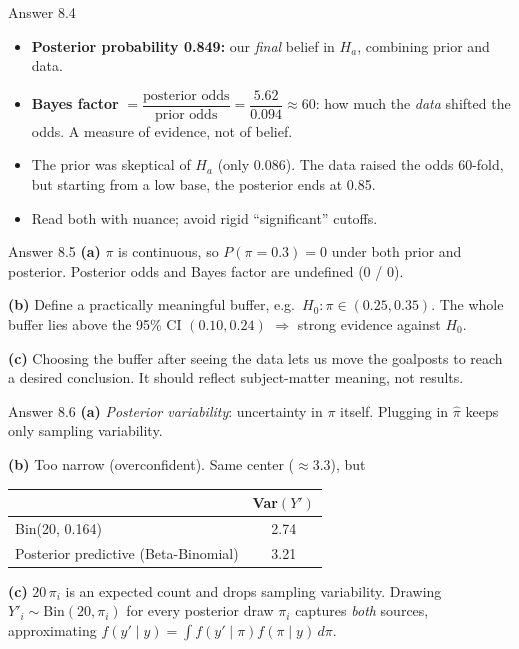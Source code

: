 \documentclass[aspectratio=43,11pt]{beamer}
\begin{document}
\begin{frame}{Answer 8.4}
  \begin{itemize}
    \item \textbf{Posterior probability 0.849:} our \emph{final} belief in
      $H_a$, combining prior and data.
    \item \textbf{Bayes factor}
      $= \dfrac{\text{posterior odds}}{\text{prior odds}}
      = \dfrac{5.62}{0.094} \approx 60$:
      how much the \emph{data} shifted the odds. A measure of evidence,
      not of belief.
    \item The prior was skeptical of $H_a$ (only 0.086). The data raised
      the odds 60-fold, but starting from a low base, the posterior ends
      at 0.85.
    \item Read both with nuance; avoid rigid ``significant'' cutoffs.
  \end{itemize}
\end{frame}

\begin{frame}{Answer 8.5}
  \textbf{(a)} $\pi$ is continuous, so $P(\pi = 0.3) = 0$ under both prior
  and posterior. Posterior odds and Bayes factor are undefined (0 / 0).
  \vspace{0.4em}

  \textbf{(b)} Define a practically meaningful buffer, e.g.\
  $H_0: \pi \in (0.25, 0.35)$. The whole buffer lies above the 95\% CI
  $(0.10, 0.24)$ $\Rightarrow$ strong evidence against $H_0$.
  \vspace{0.4em}

  \textbf{(c)} Choosing the buffer after seeing the data lets us move the
  goalposts to reach a desired conclusion. It should reflect subject-matter
  meaning, not results.
\end{frame}

\begin{frame}{Answer 8.6}
  \textbf{(a)} \emph{Posterior variability}: uncertainty in $\pi$ itself.
  Plugging in $\hat\pi$ keeps only sampling variability.
  \vspace{0.4em}

  \textbf{(b)} Too narrow (overconfident). Same center ($\approx 3.3$), but
  \begin{center}
  \begin{tabular}{@{}lc@{}}
    \toprule
    & Var$(Y')$ \\
    \midrule
    Bin(20, 0.164) & 2.74 \\
    Posterior predictive (Beta-Binomial) & 3.21 \\
    \bottomrule
  \end{tabular}
  \end{center}
  \textbf{(c)} $20\,\pi_i$ is an expected count and drops sampling
  variability. Drawing $Y'_i \sim \text{Bin}(20, \pi_i)$ for every
  posterior draw $\pi_i$ captures \emph{both} sources, approximating
  $f(y' \mid y) = \int f(y' \mid \pi) f(\pi \mid y)\, d\pi$.
\end{frame}
\end{document}
